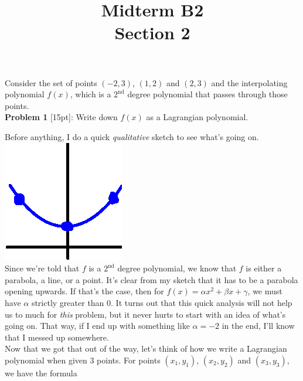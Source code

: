 \documentclass{article}
\def\a{\alpha}
\def\b{\beta}
\def\c{\gamma}
\begin{document}
 
 
 
\title{
    \textmd{\Huge{Midterm B2}}\\
    \textmd{\huge{Section 2}}
}


\maketitle

Consider the set of points $(-2, 3)$, $(1, 2)$ and $(2, 3)$ and the interpolating polynomial $f(x)$, which is a $2^\text{nd}$ degree polynomial that passes through those points. \\

\textbf{Problem 1} [15pt]: Write down $f(x)$ as a Lagrangian polynomial.

Before anything, I do a quick \textit{qualitative} sketch to see what's going on. \hspace*{3cm}\includegraphics[scale=0.5]{thumbSketch}\\

Since we're told that $f$ is a $2^\text{nd}$ degree polynomial, we know that $f$ is either a parabola, a line, or a point. It's clear from my sketch that it has to be a parabola opening upwards. If that's the case, then for $f(x) = \a x^2 + \b x + \c$, we must have $\a$ strictly greater than $0$. It turns out that this quick analysis will not help us to much for \textit{this} problem, but it never hurts to start with an idea of what's going on. That way, if I end up with something like $\a = -2$ in the end, I'll know that I messed up somewhere. \\

Now that we got that out of the way, let's think of how we write a Lagrangian polynomial when given 3 points. For points $(x_1, y_1)$, $(x_2, y_2)$ and $(x_3, y_3)$, we have the formula \\
\end{document}

